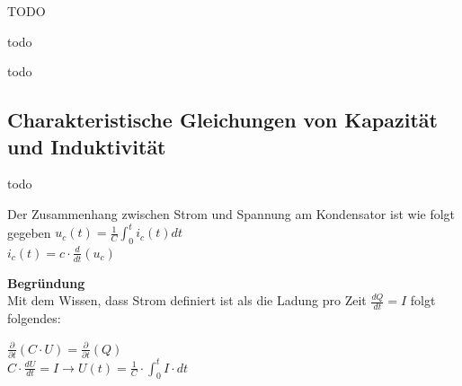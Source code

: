 \beginbsp
TODO
\iend

\beginip
todo
\iend


\beginip
todo
\iend


\subsection{Charakteristische Gleichungen von Kapazität und Induktivität}
\begingl
todo
\iend

\begingl
Der Zusammenhang zwischen Strom und Spannung am Kondensator ist wie folgt gegeben
\formulaBegin
$\displaystyle u_c(t) = \frac{1}{C} \int_0^t i_c(t) dt$ \\

$\displaystyle i_c(t) = c \cdot \frac{d}{d t} (u_c)$ \\
\formulaEnd
\iend


\textbf{Begründung} \\
Mit dem Wissen, dass Strom definiert ist als die Ladung pro Zeit $ \displaystyle \frac{dQ}{dt} = I$ folgt folgendes: \\
\begin{center}
	$\displaystyle \frac{\partial}{\partial t} (C \cdot U) = \frac{\partial}{\partial t} (Q) $ \\
	$ \displaystyle C  \cdot \frac{dU}{dt} = I \rightarrow U(t) = \frac{1}{C} \cdot \int_0^t I \cdot dt$
\end{center}
